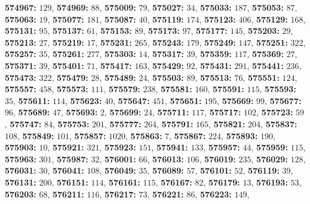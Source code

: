 \textsf{\bfseries 574967:} $129$, \textsf{\bfseries 574969:} $88$, \textsf{\bfseries 575009:} $79$, \textsf{\bfseries 575027:} $34$, \textsf{\bfseries 575033:} $187$, \textsf{\bfseries 575053:} $87$, \textsf{\bfseries 575063:} $19$, \textsf{\bfseries 575077:} $181$, \textsf{\bfseries 575087:} $40$, \textsf{\bfseries 575119:} $174$, \textsf{\bfseries 575123:} $406$, \textsf{\bfseries 575129:} $168$, \textsf{\bfseries 575131:} $95$, \textsf{\bfseries 575137:} $61$, \textsf{\bfseries 575153:} $89$, \textsf{\bfseries 575173:} $97$, \textsf{\bfseries 575177:} $145$, \textsf{\bfseries 575203:} $29$, \textsf{\bfseries 575213:} $27$, \textsf{\bfseries 575219:} $17$, \textsf{\bfseries 575231:} $265$, \textsf{\bfseries 575243:} $179$, \textsf{\bfseries 575249:} $147$, \textsf{\bfseries 575251:} $322$, \textsf{\bfseries 575257:} $35$, \textsf{\bfseries 575261:} $277$, \textsf{\bfseries 575303:} $14$, \textsf{\bfseries 575317:} $39$, \textsf{\bfseries 575359:} $117$, \textsf{\bfseries 575369:} $27$, \textsf{\bfseries 575371:} $39$, \textsf{\bfseries 575401:} $71$, \textsf{\bfseries 575417:} $163$, \textsf{\bfseries 575429:} $92$, \textsf{\bfseries 575431:} $291$, \textsf{\bfseries 575441:} $236$, \textsf{\bfseries 575473:} $322$, \textsf{\bfseries 575479:} $28$, \textsf{\bfseries 575489:} $24$, \textsf{\bfseries 575503:} $89$, \textsf{\bfseries 575513:} $76$, \textsf{\bfseries 575551:} $124$, \textsf{\bfseries 575557:} $458$, \textsf{\bfseries 575573:} $111$, \textsf{\bfseries 575579:} $238$, \textsf{\bfseries 575581:} $160$, \textsf{\bfseries 575591:} $115$, \textsf{\bfseries 575593:} $35$, \textsf{\bfseries 575611:} $114$, \textsf{\bfseries 575623:} $40$, \textsf{\bfseries 575647:} $451$, \textsf{\bfseries 575651:} $195$, \textsf{\bfseries 575669:} $99$, \textsf{\bfseries 575677:} $96$, \textsf{\bfseries 575689:} $47$, \textsf{\bfseries 575693:} $2$, \textsf{\bfseries 575699:} $24$, \textsf{\bfseries 575711:} $117$, \textsf{\bfseries 575717:} $102$, \textsf{\bfseries 575723:} $59$, \textsf{\bfseries 575747:} $84$, \textsf{\bfseries 575753:} $201$, \textsf{\bfseries 575777:} $264$, \textsf{\bfseries 575791:} $165$, \textsf{\bfseries 575821:} $204$, \textsf{\bfseries 575837:} $108$, \textsf{\bfseries 575849:} $101$, \textsf{\bfseries 575857:} $1020$, \textsf{\bfseries 575863:} $7$, \textsf{\bfseries 575867:} $224$, \textsf{\bfseries 575893:} $190$, \textsf{\bfseries 575903:} $10$, \textsf{\bfseries 575921:} $321$, \textsf{\bfseries 575923:} $151$, \textsf{\bfseries 575941:} $133$, \textsf{\bfseries 575957:} $44$, \textsf{\bfseries 575959:} $115$, \textsf{\bfseries 575963:} $301$, \textsf{\bfseries 575987:} $32$, \textsf{\bfseries 576001:} $66$, \textsf{\bfseries 576013:} $106$, \textsf{\bfseries 576019:} $235$, \textsf{\bfseries 576029:} $128$, \textsf{\bfseries 576031:} $30$, \textsf{\bfseries 576041:} $108$, \textsf{\bfseries 576049:} $35$, \textsf{\bfseries 576089:} $57$, \textsf{\bfseries 576101:} $52$, \textsf{\bfseries 576119:} $39$, \textsf{\bfseries 576131:} $200$, \textsf{\bfseries 576151:} $114$, \textsf{\bfseries 576161:} $115$, \textsf{\bfseries 576167:} $82$, \textsf{\bfseries 576179:} $13$, \textsf{\bfseries 576193:} $53$, \textsf{\bfseries 576203:} $68$, \textsf{\bfseries 576211:} $116$, \textsf{\bfseries 576217:} $73$, \textsf{\bfseries 576221:} $86$, \textsf{\bfseries 576223:} $149$, 
